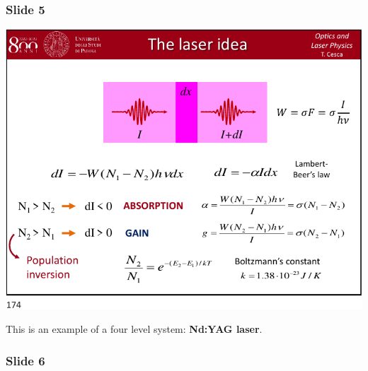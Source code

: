 \documentclass[../main/main.tex]{subfiles}
\begin{document}
\subsubsection*{Slide 5}

\begin{minipage}[]{0.5\linewidth}
\centering
\includegraphics[page=5,width=1\textwidth]{../lessons/pdf_file/09_lecture.pdf}
\end{minipage}
\hspace{0.3cm}\vspace{0.3cm}
\begin{minipage}[c]{0.47\linewidth}

This is an example of a four level system: \textbf{Nd:YAG laser}.

\end{minipage}

\subsubsection*{Slide 6}
\end{document}
